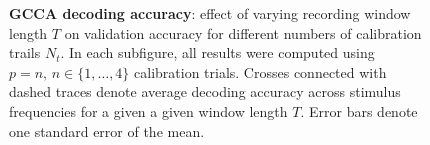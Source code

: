 \begin{figure}[htp]
\hfill
{}

\hfill
{}

\caption[GCCA decoding accuracy: effect of varying recording window length $T$ on validation accuracy for different numbers of calibration trials $p$]{\textbf{GCCA decoding accuracy}: effect of varying recording window length $T$ on validation accuracy for different numbers of calibration trails $N_t$. In each subfigure, all results were computed using $p=n, \, n\in\{1, \dots, 4\}$ calibration trials. Crosses connected with dashed traces denote average decoding accuracy across stimulus frequencies for a given a given window length $T$. Error bars denote one standard error of the mean.}
\label{fig:gcca-acc-ns}
\end{figure}

